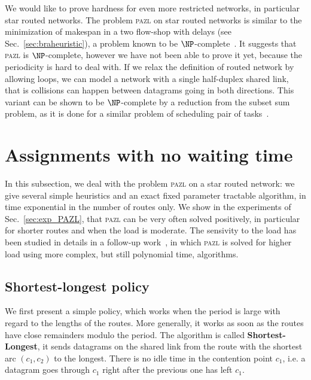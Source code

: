 \documentclass[a4paper,10pt]{article}
\newcommand\pazl{\textsc{pazl}\xspace}
\begin{document}
	We would like to prove hardness for even more restricted networks, in particular star routed networks.
   The problem \pazl on star routed networks is similar to the minimization of makespan in a two flow-shop with delays (see Sec.~\ref{sec:braheuristic}), a problem known to be $\NP$-complete~\cite{yu2004minimizing}. It suggests that \pazl is $\NP$-complete, however we have not been able to prove it yet,  because the periodicity is hard to deal with. If we relax the definition of routed network by allowing loops,
   we can model a network with a single half-duplex shared link, that is collisions can happen between datagrams going in both directions. This variant can be shown to be $\NP$-complete by a reduction from the subset sum problem, as it is done for a similar problem of scheduling pair of tasks~\cite{orman1997complexity}.
  

\section{Assignments with no waiting time} \label{sec:PAZL}
  
  In this subsection, we deal with the problem \pazl on a star routed network: 
  we give several simple heuristics and an exact fixed parameter tractable algorithm, in time exponential in the number of routes only. We show in the experiments of Sec.~\ref{sec:exp_PAZL}, that \pazl can be very often solved positively, in particular for shorter routes and when the load is moderate. The sensivity to the load has been studied in details in a follow-up work~\cite{guiraud2020scheduling}, in which \pazl is solved for higher load using more complex, but still polynomial time, algorithms. 
  
	\subsection{Shortest-longest policy}
    

    We first present a simple policy, which works when the period is large with regard to the lengths of the routes. More generally, it works as soon as the routes have close remainders modulo the period. 
    The algorithm is called {\bf Shortest-Longest}, it sends datagrams on the shared link from the route with the shortest arc $(c_1,c_2)$ to the longest. There is no idle time in the contention point $c_1$,
    i.e. a datagram goes through $c_1$ right after the previous one has left $c_1$.
      
\end{document}
